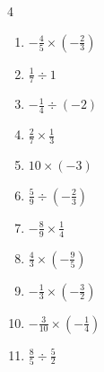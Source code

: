 \begin{multicols}{4}
\begin{enumerate}
        \phantom{$\displaystyle =-2$}

  \item $\displaystyle -\frac{4}{5}\times{}\left(-\frac{2}{3}\right)$


  \item $\displaystyle \frac{1}{7}\div{}1$


\columnbreak %

  \item $\displaystyle -\frac{1}{4}\div{}\left(-2\right)$


  \item $\displaystyle \frac{2}{7}\times{}\frac{1}{3}$


  \item $\displaystyle 10\times{}\left(-3\right)$

        \phantom{$\displaystyle =-30$}

  \item $\displaystyle \frac{5}{9}\div{}\left(-\frac{2}{3}\right)$


  \item $\displaystyle -\frac{8}{9}\times{}\frac{1}{4}$


  \item $\displaystyle \frac{4}{3}\times{}\left(-\frac{9}{5}\right)$


  \item $\displaystyle -\frac{1}{3}\times{}\left(-\frac{3}{2}\right)$


  \item $\displaystyle -\frac{3}{10}\times{}\left(-\frac{1}{4}\right)$


  \item $\displaystyle \frac{8}{5}\div{}\frac{5}{2}$



\end{enumerate}
\end{multicols}
